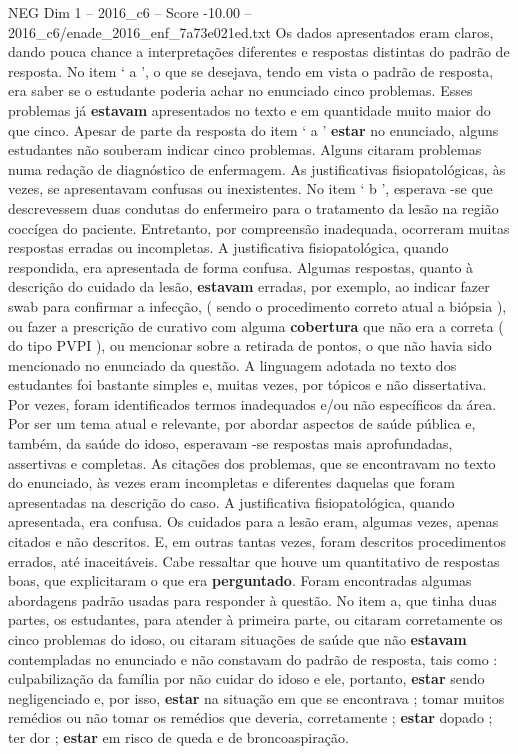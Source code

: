 \begin{textsample}{NEG Dim 1 – 2016\_c6 – Score -10.00 – 2016\_c6/enade\_2016\_enf\_7a73e021ed.txt}
Os dados apresentados eram claros, dando pouca chance a interpretações diferentes e respostas distintas do padrão de resposta.
No item ‘ a ’, o que se desejava, tendo em vista o padrão de resposta, era saber se o estudante poderia achar no enunciado cinco problemas.
Esses problemas já \textbf{estavam} apresentados no texto e em quantidade muito maior do que cinco.
Apesar de parte da resposta do item ‘ a ’ \textbf{estar} no enunciado, alguns estudantes não souberam indicar cinco problemas.
Alguns citaram problemas numa redação de diagnóstico de enfermagem.
As justificativas fisiopatológicas, às vezes, se apresentavam confusas ou inexistentes.
No item ‘ b ’, esperava -se que descrevessem duas condutas do enfermeiro para o tratamento da lesão na região coccígea do paciente.
Entretanto, por compreensão inadequada, ocorreram muitas respostas erradas ou incompletas.
A justificativa fisiopatológica, quando respondida, era apresentada de forma confusa.
Algumas respostas, quanto à descrição do cuidado da lesão, \textbf{estavam} erradas, por exemplo, ao indicar fazer swab para confirmar a infecção, ( sendo o procedimento correto atual a biópsia ), ou fazer a prescrição de curativo com alguma \textbf{cobertura} que não era a correta ( do tipo PVPI ), ou mencionar sobre a retirada de pontos, o que não havia sido mencionado no enunciado da questão.
A linguagem adotada no texto dos estudantes foi bastante simples e, muitas vezes, por tópicos e não dissertativa.
Por vezes, foram identificados termos inadequados e/ou não específicos da área.
Por ser um tema atual e relevante, por abordar aspectos de saúde pública e, também, da saúde do idoso, esperavam -se respostas mais aprofundadas, assertivas e completas.
As citações dos problemas, que se encontravam no texto do enunciado, às vezes eram incompletas e diferentes daquelas que foram apresentadas na descrição do caso.
A justificativa fisiopatológica, quando apresentada, era confusa.
Os cuidados para a lesão eram, algumas vezes, apenas citados e não descritos.
E, em outras tantas vezes, foram descritos procedimentos errados, até inaceitáveis.
Cabe ressaltar que houve um quantitativo de respostas boas, que explicitaram o que era \textbf{perguntado}.
Foram encontradas algumas abordagens padrão usadas para responder à questão.
No item a, que tinha duas partes, os estudantes, para atender à primeira parte, ou citaram corretamente os cinco problemas do idoso, ou citaram situações de saúde que não \textbf{estavam} contempladas no enunciado e não constavam do padrão de resposta, tais como : culpabilização da família por não cuidar do idoso e ele, portanto, \textbf{estar} sendo negligenciado e, por isso, \textbf{estar} na situação em que se encontrava ; tomar muitos remédios ou não tomar os remédios que deveria, corretamente ; \textbf{estar} dopado ; ter dor ; \textbf{estar} em risco de queda e de broncoaspiração.

\end{textsample}
